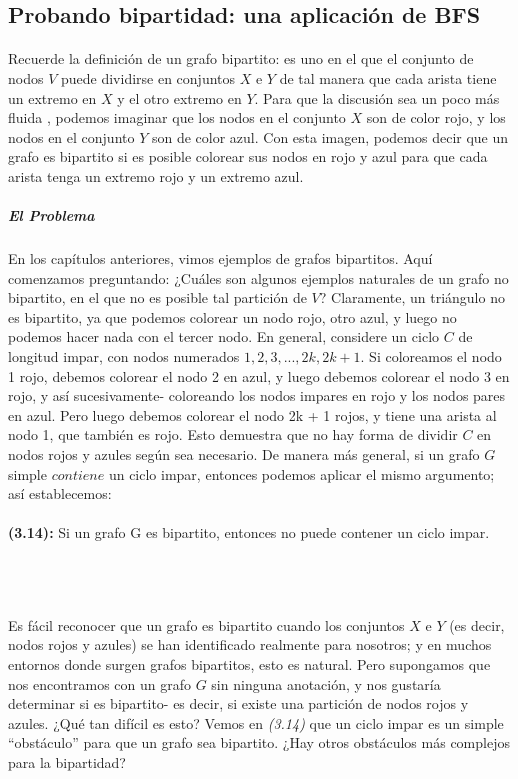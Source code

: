 \documentclass[a4paper, 12pt]{book}
\theoremstyle{dotless}
\begin{document}
\subsection{Probando bipartidad: una aplicación de BFS}
\paragraph{}
Recuerde la definición de un grafo bipartito: es uno en el que el conjunto de nodos $V$ puede dividirse en conjuntos $X$ e $Y$ de tal manera que cada arista tiene un extremo en $X$ y el otro extremo en $Y$. Para que la discusión sea un poco más fluida , podemos imaginar que los nodos en el conjunto $X$ son de color rojo, y los nodos en el conjunto $Y$ son de color azul. Con esta imagen, podemos decir que un grafo es bipartito si es posible colorear sus nodos en rojo y azul para que cada arista tenga un extremo rojo y un extremo azul.

\subparagraph{El Problema}
\paragraph{}
En los capítulos anteriores, vimos ejemplos de grafos bipartitos. Aquí comenzamos preguntando: ¿Cuáles son algunos ejemplos naturales de un grafo no bipartito, en el que no es posible tal partición de $V$?
Claramente, un triángulo no es bipartito, ya que podemos colorear un nodo rojo, otro azul, y luego no podemos hacer nada con el tercer nodo. En general, considere un ciclo $C$ de longitud impar, con nodos numerados \(1, 2, 3,. . . , 2k, 2k + 1\). Si coloreamos el nodo 1 rojo, debemos colorear el nodo 2 en azul, y luego debemos colorear el nodo 3 en rojo, y así sucesivamente- coloreando los nodos impares en rojo y los nodos pares en azul. Pero luego debemos colorear el nodo 2k + 1 rojos, y tiene una arista al nodo 1, que también es rojo. Esto demuestra que no hay forma de dividir $C$ en nodos rojos y azules según sea necesario. De manera más general, si un grafo $G$ simple $contiene$ un ciclo impar, entonces podemos aplicar el mismo argumento; así establecemos:


\paragraph{}
\colorbox{mygray}{\parbox{15cm}{
	\textbf{(3.14):} Si un grafo G es bipartito, entonces no puede contener un ciclo impar.}}\\\\
\paragraph{}
Es fácil reconocer que un grafo es bipartito cuando los conjuntos $X$ e $Y$ (es decir, nodos rojos y azules) se han identificado realmente para nosotros; y en muchos entornos donde surgen grafos bipartitos, esto es natural. Pero supongamos que nos encontramos con un grafo $G$ sin ninguna anotación, y nos gustaría determinar si es bipartito- es decir, si existe una partición de nodos rojos y azules. ¿Qué tan difícil es esto? Vemos en \textit{(3.14)} que un ciclo impar es un simple ``obstáculo'' para que un grafo sea bipartito. ¿Hay otros obstáculos más complejos para la bipartidad?
\end{document}
